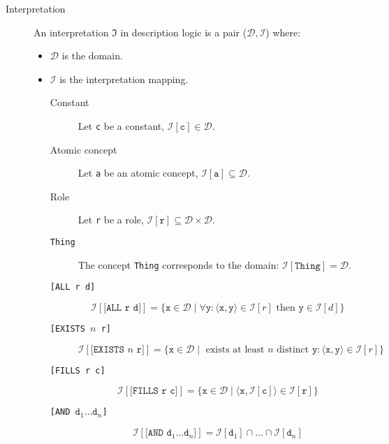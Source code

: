 \begin{description}
    \item[Interpretation] 
        An interpretation $\mathfrak{I}$ in description logic is a pair ($\mathcal{D}, \mathcal{I}$) where:
        \begin{itemize}
            \item $\mathcal{D}$ is the domain.
            \item $\mathcal{I}$ is the interpretation mapping.
                \begin{description}
                    \item[Constant] 
                        Let \texttt{c} be a constant, $\mathcal{I}[\texttt{c}] \in \mathcal{D}$. 
                    \item[Atomic concept] 
                        Let \texttt{a} be an atomic concept, $\mathcal{I}[\texttt{a}] \subseteq \mathcal{D}$. 
                    \item[Role] 
                        Let \texttt{r} be a role, $\mathcal{I}[\texttt{r}] \subseteq \mathcal{D} \times \mathcal{D}$.
                    \item[\texttt{Thing}] 
                        The concept \texttt{Thing} corresponds to the domain: $\mathcal{I}[\texttt{Thing}] = \mathcal{D}$.
                    \item[\texttt{[ALL r d]}]
                        \[
                            \mathcal{I}[\texttt{[ALL r d]}] = 
                            \{ \texttt{x} \in \mathcal{D} \mid \forall \texttt{y}: 
                            \langle \texttt{x}, \texttt{y} \rangle \in \mathcal{I}[r] \text{ then } \texttt{y} \in \mathcal{I}[d] \}
                        \]
                    \item[\texttt{[EXISTS $n$ r]}] 
                        \[ 
                            \mathcal{I}[\texttt{[EXISTS $n$ r]}] = 
                            \{ \texttt{x} \in \mathcal{D} \mid \text{ exists at least $n$ distinct } \texttt{y}: 
                            \langle \texttt{x}, \texttt{y} \rangle \in \mathcal{I}[r] \}
                        \]
                    \item[\texttt{[FILLS r c]}] 
                        \[ 
                            \mathcal{I}[\texttt{[FILLS r c]}] = \{ \texttt{x} \in \mathcal{D} \mid 
                            \langle \texttt{x}, \mathcal{I}[\texttt{c}] \rangle \in \mathcal{I}[\texttt{r}] \} 
                        \]
                    \item[\texttt{[AND $\texttt{d}_1 \dots \texttt{d}_n$]}] 
                        \[ 
                            \mathcal{I}[\texttt{[AND $\texttt{d}_1 \dots \texttt{d}_n$]}] = 
                                \mathcal{I}[\texttt{d}_1] \cap \dots \cap \mathcal{I}[\texttt{d}_n]
                        \]
                \end{description}
        \end{itemize}


\end{description}
